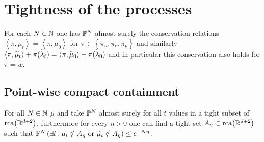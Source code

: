 \section{Tightness of the processes}

For each $N\in\mathbb{N}$ one has $\mathbb{P}^N$-almost surely the conservation relations $\left<\pi, \mu_t \right> = \left<\pi, \mu_0 \right>$ for $\pi \in \left\{\pi_n, \pi_e, \pi_p \right\}$ and similarly $\left<\pi, \widetilde{\mu}_t \right> +\pi(\widetilde{\lambda}_t)= \left<\pi, \widetilde{\mu}_0 \right> + \pi(\widetilde{\lambda}_0)$ and in particular this conservation also holds for $\pi = w$.

\subsection{Point-wise compact containment}

\begin{proposition}
For all $N\in \mathbb{N}$ $\mu$ and \tmu take $\mathbb{P}^N$ almost surely for all $t$ values in a tight subset of $\mathrm{rca}{\left({\mathbb{R}^{d+2}}\right)}$, furthermore for every $\eta > 0$ one can find a tight set $A_\eta \subset \mathrm{rca}{\left({\mathbb{R}^{d+2}}\right)}$ such that $\mathbb{P}^N\left(\exists t \colon \mu_t \notin A_\eta \text{ or } \widetilde{\mu}_t \notin A_\eta \right) \leq e^{-N \eta}$.
\end{proposition}
